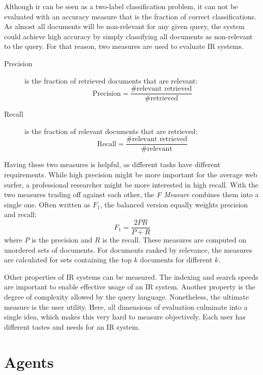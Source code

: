 \documentclass[../main.tex]{subfiles}
\begin{document}
Although \gls{ir} can be seen as a two-label classification problem,
it can not be evaluated with an accuracy measure
that is the fraction of correct classifications.
As almost all documents will be non-relevant for any given query,
the system could achieve high accuracy by simply classifying all documents
as non-relevant to the query.
For that reason, two measures are used to evaluate IR systems.
\begin{description}
    \item[Precision] is the fraction of retrieved documents that are relevant:
        \begin{equation}
            \text{Precision} = \frac{\text{\#relevant retrieved}}{\text{\#retrieved}}
        \end{equation}
    \item[Recall] is the fraction of relevant documents that are retrieved:
        \begin{equation}
            \text{Recall} = \frac{\text{\#relevant retrieved}}{\text{\#relevant}}
        \end{equation}
\end{description}
Having these two measures is helpful, as different tasks have different requirements.
While high precision might be more important for the average web surfer,
a professional researcher might be more interested in high recall.
With the two measures trading off against each other, the \emph{F Measure} combines
them into a single one.
Often written as $F_1$, the balanced version equally weights precision and recall:
\begin{equation}
    F_1 = \frac{2PR}{P+R}
\end{equation}
where $P$ is the precision and $R$ is the recall.
These measures are computed on unordered sets of documents.
For documents ranked by relevance,
the measures are calculated for sets containing the top $k$ documents for different $k$.

Other properties of IR systems can be measured.
The indexing and search speeds are important to enable effective usage of an IR system.
Another property is the degree of complexity allowed by the query language.
Nonetheless, the ultimate measure is the user utility.
Here, all dimensions of evaluation culminate into a single idea,
which makes this very hard to measure objectively.
Each user has different tastes and needs for an IR system.

\section{Agents}
\label{sec:agents}
\end{document}
